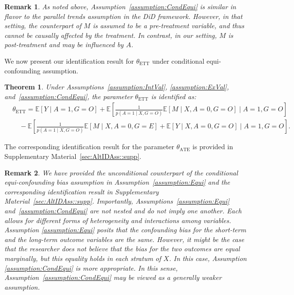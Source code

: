 \documentclass[10pt]{article}
\newtheorem{theorem}{Theorem}
\newtheorem{remark}{Remark}
\newcommand{\E}{\mathbb{E}}
\begin{document}
\begin{remark}
As noted above, Assumption~\ref{assumption:CondEqui} is similar in flavor to the parallel trends assumption in the DiD framework. However, in that setting, the counterpart of $M$ is assumed to be a pre-treatment variable, and thus cannot be causally affected by the treatment. In contrast, in our setting, $M$ is post-treatment and may be influenced by $A$.
\end{remark}

We now present our identification result for $\theta_{\text{ETT}}$ under conditional equi-confounding assumption.

\begin{theorem}
\label{thm:equiETTCond}
Under Assumptions~\ref{assumption:IntVal}, \ref{assumption:ExVal}, and~\ref{assumption:CondEqui}, the parameter $\theta_{\text{ETT}}$ is identified as:
{\footnotesize
\begin{equation}
\label{eq:param1}
\begin{aligned}
&\theta_{\text{ETT}} 
= \E[Y \mid A=1, G=O] 
+ \E\left[ \frac{1}{p(A=1 \mid X, G=O)} \E[M \mid X, A=0, G=O] \mid A=1, G=O \right] \\
&\quad - \E\left[ \frac{1}{p(A=1 \mid X, G=O)} \E[M \mid X, A=0, G=E] + \E[Y \mid X, A=0, G=O] \mid A=1, G=O \right].
\end{aligned}
\end{equation}
}
\end{theorem}
The corresponding identification result for the parameter $\theta_{\text{ATE}}$ is provided in Supplementary Material~\ref{sec:AltIDAss::supp}. 

\begin{remark}
We have provided the unconditional counterpart of the conditional equi-confounding bias assumption in Assumption~\ref{assumption:Equi} and the corresponding identification result in Supplementary Material~\ref{sec:AltIDAss::supp}. Importantly, Assumptions~\ref{assumption:Equi} and~\ref{assumption:CondEqui} are not nested and do not imply one another. Each allows for different forms of heterogeneity and interactions among variables. Assumption \ref{assumption:Equi} posits that the confounding bias for the short-term and the long-term outcome variables are the same. However, it might be the case that the researcher does not believe that the bias for the two outcomes are equal marginally, but this equality holds in each stratum of $X$. In this case, Assumption \ref{assumption:CondEqui} is more appropriate. In this sense, Assumption~\ref{assumption:CondEqui} may be viewed as a generally weaker assumption.
\end{remark}
\end{document}
